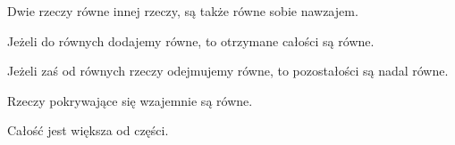 \item Dwie rzeczy równe innej rzeczy, są także równe sobie nawzajem.
\item Jeżeli do równych dodajemy równe, to otrzymane całości są równe.
\item Jeżeli zaś od równych rzeczy odejmujemy równe, to pozostałości są
    nadal równe.
\item Rzeczy pokrywające się wzajemnie są równe.
\item Całość jest większa od części.
